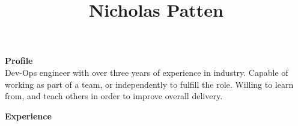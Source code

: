 \documentclass[a4paper,12pt,final,sans]{memoir}
\title{\vspace{-2.5cm} \textbf{\textsf{\color{head} Nicholas Patten}}\\}
\date{\vspace{-7.0em}}
\begin{document}
\maketitle %
\thispagestyle{empty} %

\vspace{2mm}
\textbf{\textsf{\color{head} \large{Profile} }} \\[0.3em]
Dev-Ops engineer with over three years of experience in industry. Capable of working as part of a team, or independently to fulfill the role. Willing to learn from, and teach others in order to improve overall delivery. \\


\vskip-2mm

\textbf{\textsf{\color{head} \large{Experience} }}\\[-1.5em]
\end{document}
